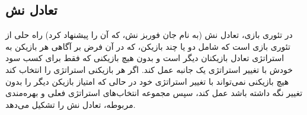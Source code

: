 \subsection{تعادل نش}
در تئوری بازی، تعادل نش (به نام جان فوربز نش، که آن را پیشنهاد کرد) راه حلی از تئوری بازی است که شامل دو یا چند بازیکن، که در آن فرض بر آگاهی هر بازیکن به استراتژی تعادل بازیکنان دیگر است و بدون هیچ بازیکنی که فقط برای کسب سود خودش با تغییر استراتژی یک جانبه عمل کند. اگر هر بازیکنی استراتژی را انتخاب کند هیچ بازیکنی نمی‌تواند با تغییر استراتژی خود در حالی که امتیاز بازیکن دیگر را بدون تغییر نگه داشته باشد عمل کند، سپس مجموعه انتخاب‌های استراتژی فعلی و بهره‌مندی مربوطه، تعادل نش را تشکیل می‌دهد.



